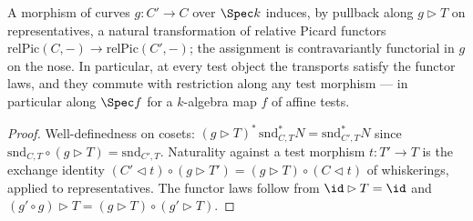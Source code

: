 \begin{lemma}
  \label{pa-lem:relPicMapCurve}
  \leanok

  A morphism of curves \(g \colon C' \to C\) over \(\Spec k\) induces, by pullback along
  \(g \rhd T\) on representatives, a natural transformation of relative Picard functors
  \(\mathrm{relPic}(C,-) \to \mathrm{relPic}(C',-)\); the assignment is contravariantly
  functorial in \(g\) on the nose. In particular, at every test object the transports
  satisfy the functor laws, and they commute with restriction along any test morphism ---
  in particular along \(\Spec f\) for a \(k\)-algebra map \(f\) of affine tests.
\end{lemma}
\begin{proof}
  \leanok
  Well-definedness on cosets: \((g \rhd T)^{*}\,\mathrm{snd}_{C,T}^{*} N =
  \mathrm{snd}_{C',T}^{*} N\) since \(\mathrm{snd}_{C,T} \circ (g \rhd T) =
  \mathrm{snd}_{C',T}\). Naturality against a test morphism \(t \colon T' \to T\) is the
  exchange identity \((C' \lhd t) \circ (g \rhd T') = (g \rhd T) \circ (C \lhd t)\) of
  whiskerings, applied to representatives. The functor laws follow from
  \(\id \rhd T = \id\) and \((g' \circ g) \rhd T = (g \rhd T) \circ (g' \rhd T)\).
\end{proof}

